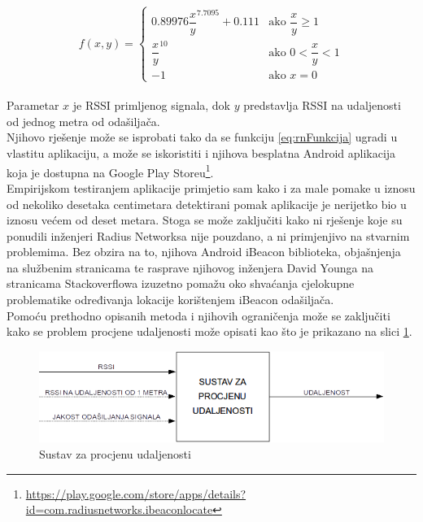 \begin{equation}
	\label{eq:rnFunkcija}
	f(x,y) = 
	\begin{cases}	
	0.89976 {\dfrac{x}{y}}^{7.7095} + 0.111 & \text{ako } \dfrac{x}{y} \geq 1 \\
	{\dfrac{x}{y}}^{10} & \text{ako } 0 < \dfrac{x}{y} < 1 \\
	-1 & \text{ako } x = 0 	
	\end{cases}
\end{equation}
\\

Parametar $x$ je RSSI primljenog signala, dok $y$ predstavlja RSSI na udaljenosti od jednog metra od odašiljača. 
\\

Njihovo rješenje može se isprobati tako da se funkciju \eqref{eq:rnFunkcija} ugradi u vlastitu aplikaciju, a može se iskoristiti i njihova besplatna Android aplikacija koja je dostupna na Google Play Storeu\footnote{\url{https://play.google.com/store/apps/details?id=com.radiusnetworks.ibeaconlocate}}.
\\
Empirijskom testiranjem aplikacije primjetio sam kako i za male pomake u iznosu od nekoliko desetaka centimetara detektirani pomak aplikacije je nerijetko bio u iznosu većem od deset metara. 
Stoga se može zaključiti kako ni rješenje koje su ponudili inženjeri Radius Networksa nije pouzdano, a ni primjenjivo na stvarnim problemima. 
Bez obzira na to, njihova Android iBeacon biblioteka, objašnjenja na službenim stranicama te rasprave njihovog inženjera David Younga na stranicama Stackoverflowa izuzetno pomažu oko shvaćanja cjelokupne problematike određivanja lokacije korištenjem iBeacon odašiljača.
\\

Pomoću prethodno opisanih metoda i njihovih ograničenja može se zaključiti kako se problem procjene udaljenosti može opisati kao što je prikazano na slici \ref{fig:sustavZaProcjenuUdaljenosti}.

\begin{figure}[H]
    \centering
    \includegraphics[scale=0.68]{pictures/sustav-za-procjenu-udaljenosti}
    \caption{Sustav za procjenu udaljenosti}
    \label{fig:sustavZaProcjenuUdaljenosti}
\end{figure}

